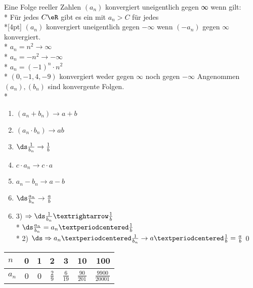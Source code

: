 %
%
\wdh
Eine Folge reeller Zahlen $(a_n)$ konvergiert uneigentlich gegen ∞ wenn gilt:\\*
Für jedes $C\eR$ gibt es ein \nN{} mit $a_n > C$ für jedes \nN\\*[4pt]
$(a_n)$ konvergiert uneigentlich gegen $- ∞$ wenn $(-a_n)$ gegen $∞$ konvergiert.\\*
%
%
\bsp
$a_n = n^2 \to ∞$\\*
$a_n = -n^2 \to -∞$\\*
$a_n = (-1)^n · n^2$\\*
$(0, -1, 4, -9)$ konvergiert weder gegen $∞$ noch gegen $ - ∞$
%
Angenommen $(a_n), (b_n)$ sind konvergente Folgen.\\*
\begin{enumerate}
\item{$(a_n + b_n) \to a + b$}
\item{$(a_n · b_n) \to ab$}
\item{$\ds\frac{1}{b_n} \to \frac{1}{b}$}
\item{$c · a_n \to c · a$}
\item{$a_n - b_n \to a - b$}
\item{$\ds\frac{a_n}{b_n} \to \frac{a}{b}$}
\end{enumerate}
%
\bew
\begin{enumerate}
\setcounter{enumi}{5}
\item{3) $\Rightarrow\ds\frac{1}{b_n}→\frac{1}{b}$\\*
$\ds\frac{a_n}{b_n} = a_n ·\frac{1}{b}$\\*
2) $\ds\Rightarrow a_n · \frac{1}{b_n} \to a ·\frac{1}{b} = \frac{a}{b}$\qed}
\end{enumerate}
\bsp
\begin{tabular}{l|c|c|c|c|c|r}
$n$   & 0 & 1 & 2 & 3 & 10 & 100\\*\hline
$a_n$ & 0 & 0 & $\frac{2}{9}$ & $\frac{6}{19}$ & $\frac{90}{201}$ & $\frac{9900}{20001}$ \\*
\end{tabular}
